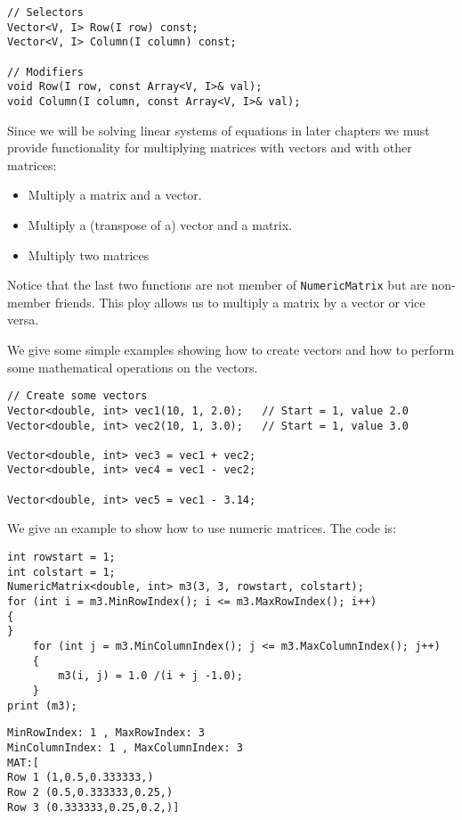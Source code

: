 \begin{lstlisting}
// Selectors
Vector<V, I> Row(I row) const;
Vector<V, I> Column(I column) const;

// Modifiers
void Row(I row, const Array<V, I>& val);
void Column(I column, const Array<V, I>& val);
\end{lstlisting}
Since we will be solving linear systems of equations in later chapters we must provide functionality for multiplying matrices with vectors and with other matrices:
\begin{itemize}
	\item Multiply a matrix and a vector.
	\item Multiply a (transpose of a) vector and a matrix.
	\item Multiply two matrices
\end{itemize}
Notice that the last two functions are not member of \texttt{NumericMatrix} but are non-member friends. This ploy allows us to multiply a matrix by a vector or vice versa.

We give some simple examples showing how to create vectors and how to perform some mathematical operations on the vectors.

\begin{lstlisting}
// Create some vectors
Vector<double, int> vec1(10, 1, 2.0);	// Start = 1, value 2.0
Vector<double, int> vec2(10, 1, 3.0);	// Start = 1, value 3.0

Vector<double, int> vec3 = vec1 + vec2;
Vector<double, int> vec4 = vec1 - vec2;

Vector<double, int> vec5 = vec1 - 3.14;
\end{lstlisting}
We give an example to show how to use numeric matrices. The code is:
\begin{lstlisting}
int rowstart = 1;
int colstart = 1;
NumericMatrix<double, int> m3(3, 3, rowstart, colstart);
for (int i = m3.MinRowIndex(); i <= m3.MaxRowIndex(); i++)
{
}
	for (int j = m3.MinColumnIndex(); j <= m3.MaxColumnIndex(); j++)
	{
		m3(i, j) = 1.0 /(i + j -1.0);
	}
print (m3);
\end{lstlisting}

\begin{lstlisting}
MinRowIndex: 1 , MaxRowIndex: 3
MinColumnIndex: 1 , MaxColumnIndex: 3
MAT:[
Row 1 (1,0.5,0.333333,)
Row 2 (0.5,0.333333,0.25,)
Row 3 (0.333333,0.25,0.2,)]
\end{lstlisting}